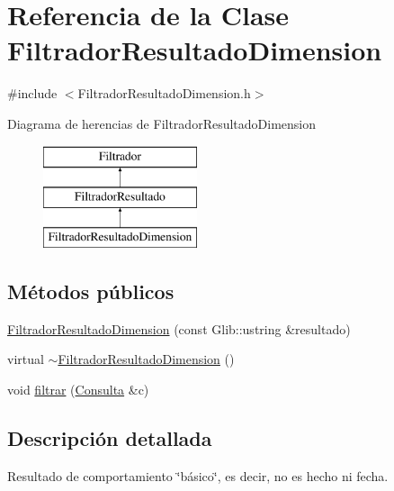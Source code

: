 \hypertarget{classFiltradorResultadoDimension}{\section{\-Referencia de la \-Clase \-Filtrador\-Resultado\-Dimension}
\label{classFiltradorResultadoDimension}
}


{\ttfamily \#include $<$\-Filtrador\-Resultado\-Dimension.\-h$>$}

\-Diagrama de herencias de \-Filtrador\-Resultado\-Dimension\begin{figure}[H]
\begin{center}
\leavevmode
\includegraphics[height=3.000000cm]{classFiltradorResultadoDimension}
\end{center}
\end{figure}
\subsection*{\-Métodos públicos}
\begin{DoxyCompactItemize}
\item 
\hyperlink{classFiltradorResultadoDimension_a40533f3fff8e52b1b4ffe897ef96bab0}{\-Filtrador\-Resultado\-Dimension} (const \-Glib\-::ustring \&resultado)
\item 
virtual \hyperlink{classFiltradorResultadoDimension_aae58c32a57db065571570f6cbea61b59}{$\sim$\-Filtrador\-Resultado\-Dimension} ()
\item 
void \hyperlink{classFiltradorResultadoDimension_a60562082b3ad8788d4f912752093eb09}{filtrar} (\hyperlink{classConsulta}{\-Consulta} \&c)
\end{DoxyCompactItemize}


\subsection{\-Descripción detallada}
\-Resultado de comportamiento \char`\"{}básico\char`\"{}, es decir, no es hecho ni fecha. 

